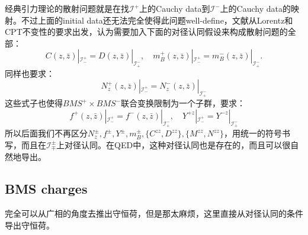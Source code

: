 经典引力理论的散射问题就是在找$\mathcal{I}^+$上的Cauchy data到$\mathcal{I}^-$上的Cauchy data的映射。不过上面的initial data还无法完全使得此问题well-define，文献\cite{Strominger:2013jfa}从Lorentz和CPT不变性的要求出发，认为需要加入下面的对径认同假设来构成散射问题的全部：
\begin{equation}
	C(z,\bar{z})|_{\mathcal{I}_{-}^{+}}=D(z,\bar{z})|_{\mathcal{I}_{+}^{-}},\quad m^+_{B}(z,\bar{z})|_{\mathcal{I}_{-}^{+}}=m^-_{B}(z,\bar{z})|_{\mathcal{I}_{+}^{-}}.
\end{equation}
同样也要求\cite{Kapec:2014opa}：
\begin{equation}
	N^+_{z}(z,\bar{z})|_{\mathcal{I}_{-}^{+}}=N^-_{z}(z,\bar{z})|_{\mathcal{I}_{+}^{-}}
\end{equation}
这些式子也使得$BMS^+\times BMS^-$联合变换限制为一个子群，要求：
\begin{equation}
	f^+(z,\bar z)|_{\mathcal{I}^+_-}=f^-(z,\bar z)|_{\mathcal{I}^-_+},\quad Y^{+z}|_{\mathcal{I}^+_-}=Y^{-z}|_{\mathcal{I}^-_+}
\end{equation}
所以后面我们不再区分$N_z^{\pm},f^{\pm},Y^{\pm},m_B^{\pm},\{C^{zz},D^{zz}\},\{M^{zz},N^{zz}\}$，用统一的符号书写，而且在$\mathcal{I}^{\pm}_{\mp}$上对径认同。在QED中，这种对径认同也是存在的，而且可以很自然地导出。
\subsection{BMS charges}
完全可以从广相的角度去推出守恒荷，但是那太麻烦，这里直接从对径认同的条件导出守恒荷。

